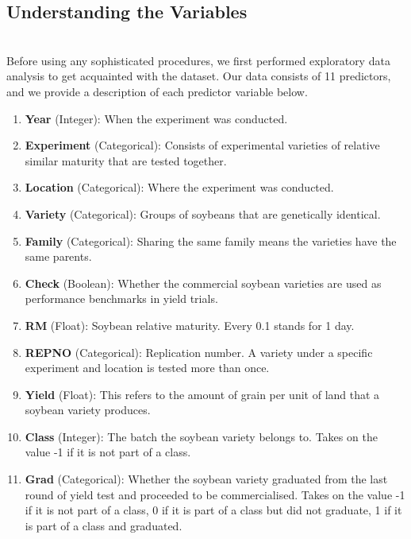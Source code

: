 \documentclass[psamsfonts]{amsart}
\begin{document}
\subsection*{Understanding the Variables}
\hfill \\

 Before using any sophisticated procedures, we first performed exploratory data analysis to get acquainted with the dataset. Our data consists of 11 predictors, and we provide a description of each predictor variable below.\\

\begin{enumerate}
    \item \textbf{Year} (Integer): When the experiment was conducted.
    \item \textbf{Experiment} (Categorical): Consists of experimental varieties of relative similar maturity that are tested together.
    \item \textbf{Location} (Categorical): Where the experiment was conducted. 
    \item \textbf{Variety} (Categorical): Groups of soybeans that are genetically identical. 
    \item \textbf{Family} (Categorical): Sharing the same family means the varieties have the same parents.
    \item \textbf{Check} (Boolean): Whether the commercial soybean varieties are used as performance benchmarks in yield trials. 
    \item \textbf{RM} (Float): Soybean relative maturity. Every 0.1 stands for 1 day.
    \item \textbf{REPNO} (Categorical): Replication number. A variety under a specific experiment and location is tested more than once.
    \item \textbf{Yield} (Float): This refers to the amount of grain per unit of land that a soybean variety produces. 
    \item \textbf{Class} (Integer): The batch the soybean variety belongs to. Takes on the value -1 if it is not part of a class.
    \item \textbf{Grad} (Categorical): Whether the soybean variety graduated from the last round of yield test and proceeded to be commercialised. Takes on the value -1 if it is not part of a class, 0 if it is part of a class but did not graduate, 1 if it is part of a class and graduated.\\
\end{enumerate}
\end{document}
